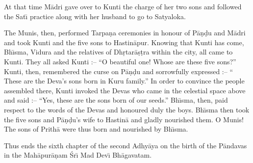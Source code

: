 At that time M\=adri gave over to Kunti the charge of her two sons and followed the Sat\={\i} practice along with her husband to go to Satyaloka.

The Munis, then, performed Tarpa\d{n}a ceremonies in honour of P\=a\d{n}\d{d}u and M\=adri and took Kunti and the five sons to Hastin\=apur. Knowing that Kunti has come, Bh\={\i}sma, Vidura and the relatives of Dh\d{r}tar\=a\d{s}\d{t}ra within the city, all came to Kunti. They all asked Kunti :-- ``O beautiful one! Whose are these five sons?'' Kunti, then, remembered the curse on P\=a\d{n}\d{d}u and sorrowfully expressed :-- `` These are the Deva's sons born in Kuru family.'' In order to convince the people assembled there, Kunti invoked the Devas who came in the celestial space above and said :-- ``Yes, these are the sons born of our seeds.'' Bh\={\i}sma, then, paid respect to the words of the Devas and honoured duly the boys. Bh\={\i}sma then took the five sons and P\=a\d{n}\d{d}u's wife to Hastin\=a and gladly nourished them. O Munis! The sons of Prith\=a were thus born and nourished by Bh\={\i}sma.

Thus ends the sixth chapter of the second Adhy\=aya on the birth of the P\=andavas in the Mah\=apur\=a\d{n}am \'Sr\={\i} Mad Dev\={\i} Bh\=agavatam.



